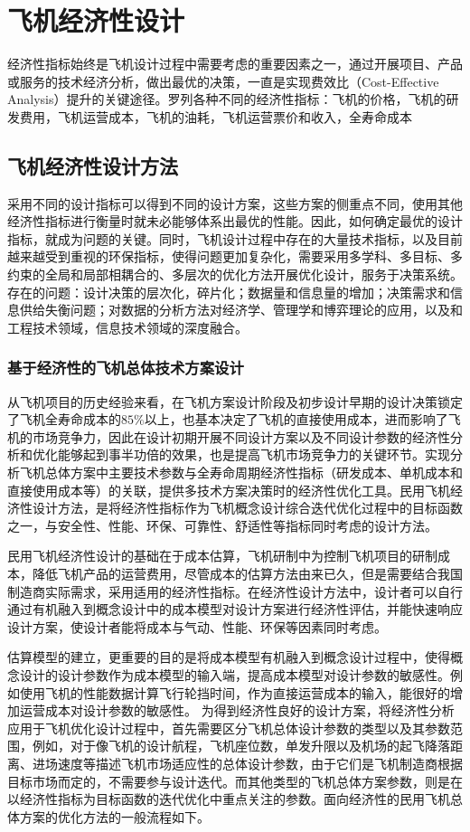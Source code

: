 \chapter{飞机经济性设计}\label{design2cost}


经济性指标始终是飞机设计过程中需要考虑的重要因素之一，通过开展项目、产品或服务的技术经济分析，做出最优的决策，一直是实现费效比（Cost-Effective Analysis）提升的关键途径。罗列各种不同的经济性指标：飞机的价格，飞机的研发费用，飞机运营成本，飞机的油耗，飞机运营票价和收入，全寿命成本

\section{飞机经济性设计方法}
采用不同的设计指标可以得到不同的设计方案，这些方案的侧重点不同，使用其他经济性指标进行衡量时就未必能够体系出最优的性能。因此，如何确定最优的设计指标，就成为问题的关键。同时，飞机设计过程中存在的大量技术指标，以及目前越来越受到重视的环保指标，使得问题更加复杂化，需要采用多学科、多目标、多约束的全局和局部相耦合的、多层次的优化方法开展优化设计，服务于决策系统。存在的问题：设计决策的层次化，碎片化；数据量和信息量的增加；决策需求和信息供给失衡问题；对数据的分析方法对经济学、管理学和博弈理论的应用，以及和工程技术领域，信息技术领域的深度融合。

\subsection{基于经济性的飞机总体技术方案设计}
从飞机项目的历史经验来看，在飞机方案设计阶段及初步设计早期的设计决策锁定了飞机全寿命成本的$85\%$以上，也基本决定了飞机的直接使用成本，进而影响了飞机的市场竞争力，因此在设计初期开展不同设计方案以及不同设计参数的经济性分析和优化能够起到事半功倍的效果，也是提高飞机市场竞争力的关键环节。实现分析飞机总体方案中主要技术参数与全寿命周期经济性指标（研发成本、单机成本和直接使用成本等）的关联，提供多技术方案决策时的经济性优化工具。民用飞机经济性设计方法，是将经济性指标作为飞机概念设计综合迭代优化过程中的目标函数之一，与安全性、性能、环保、可靠性、舒适性等指标同时考虑的设计方法。

民用飞机经济性设计的基础在于成本估算，飞机研制中为控制飞机项目的研制成本，降低飞机产品的运营费用，尽管成本的估算方法由来已久，但是需要结合我国制造商实际需求，采用适用的经济性指标。在经济性设计方法中，设计者可以自行通过有机融入到概念设计中的成本模型对设计方案进行经济性评估，并能快速响应设计方案，使设计者能将成本与气动、性能、环保等因素同时考虑。

估算模型的建立，更重要的目的是将成本模型有机融入到概念设计过程中，使得概念设计的设计参数作为成本模型的输入端，提高成本模型对设计参数的敏感性。例如使用飞机的性能数据计算飞行轮挡时间，作为直接运营成本的输入，能很好的增加运营成本对设计参数的敏感性。
为得到经济性良好的设计方案，将经济性分析应用于飞机优化设计过程中，首先需要区分飞机总体设计参数的类型以及其参数范围，例如，对于像飞机的设计航程，飞机座位数，单发升限以及机场的起飞降落距离、进场速度等描述飞机市场适应性的总体设计参数，由于它们是飞机制造商根据目标市场而定的，不需要参与设计迭代。而其他类型的飞机总体方案参数，则是在以经济性指标为目标函数的迭代优化中重点关注的参数。面向经济性的民用飞机总体方案的优化方法的一般流程如下。

